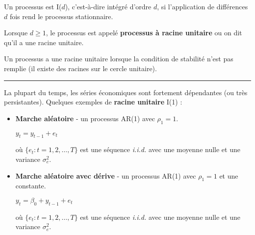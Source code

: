   \begin{f}

Un processus est I(\(d\)), c'est-à-dire intégré d'ordre \(d\), si l'application de différences \(d\) fois rend le processus stationnaire.

Lorsque \(d \geq 1\), le processus est appelé \textbf{processus à racine unitaire} ou on dit qu'il a une racine unitaire.

Un processus a une racine unitaire lorsque la condition de stabilité n'est pas remplie (il existe des racines sur le cercle unitaire).

\end{f}  \hrule  

\begin{f}

La plupart du temps, les séries économiques sont fortement dépendantes (ou très persistantes). Quelques exemples de \textbf{racine unitaire} I(1) :

\begin{itemize}[leftmargin=*]
	\item \textbf{Marche aléatoire} - un processus AR(1) avec \(\rho_{1} = 1\).
	
	\begin{center}
		\(y_{t} = y_{t - 1} + e_{t}\)
	\end{center}
	
	où \(\lbrace e_{t} : t = 1, 2, \ldots, T \rbrace\) est une séquence \textsl{i.i.d.} avec une moyenne nulle et une variance \(\sigma^{2}_{e}\).
	
	\item \textbf{Marche aléatoire avec dérive} - un processus AR(1) avec \(\rho_{1} = 1\) et une constante.
	
	\begin{center}
		\(y_{t} = \beta_{0} + y_{t - 1} + e_{t}\)
	\end{center}
	
	où \(\lbrace e_{t} : t = 1, 2, \ldots, T \rbrace\) est une séquence \textsl{i.i.d.} avec une moyenne nulle et une variance \(\sigma^{2}_{e}\).
\end{itemize}

\end{f} 

